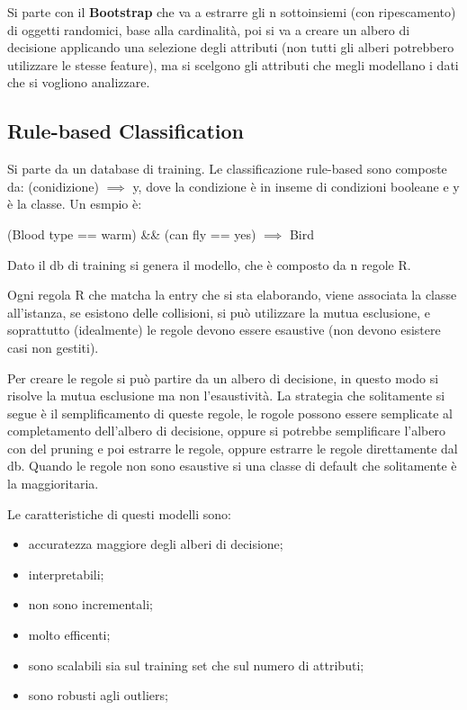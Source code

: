 \documentclass[12pt]{article}
\begin{document}
Si parte con il \textbf{Bootstrap} che va a estrarre gli n sottoinsiemi (con ripescamento) di oggetti randomici, base alla cardinalit\`a, poi si va a creare un albero di decisione applicando una selezione degli attributi (non tutti gli alberi potrebbero utilizzare le stesse feature), ma si scelgono gli attributi che megli modellano i dati che si vogliono analizzare.


\subsection{Rule-based Classification}
Si parte da un database di training. Le classificazione rule-based sono composte da: (conidizione) $ \implies $ y, dove la condizione \`e in inseme di condizioni booleane e y \`e la classe. Un esmpio \`e:
\begin{center}
    (Blood type == warm) \&\& (can fly == yes) $ \implies$ Bird
\end{center}
Dato il db di training si genera il modello, che \`e composto da n regole R.

Ogni regola R che matcha la entry che si sta elaborando, viene associata la classe all'istanza, se esistono delle collisioni, si pu\`o utilizzare la mutua esclusione, e soprattutto (idealmente) le regole devono essere esaustive (non devono esistere casi non gestiti).

Per creare le regole si pu\`o partire da un albero di decisione, in questo modo si risolve la mutua esclusione ma non l'esaustivit\`a. La strategia che solitamente si segue \`e il semplificamento di queste regole, le rogole possono essere semplicate al completamento dell'albero di decisione, oppure si potrebbe semplificare l'albero con del pruning e poi estrarre le regole, oppure estrarre  le regole direttamente dal db. Quando le regole non sono esaustive si una classe di default che solitamente \`e la maggioritaria.

Le caratteristiche di questi modelli sono:
\begin{itemize}
    \item accuratezza maggiore degli alberi di decisione;
    \item interpretabili;
    \item non sono incrementali;
    \item molto efficenti;
    \item sono scalabili sia sul training set che sul numero di attributi;
    \item sono robusti agli outliers;
\end{itemize}
\end{document}

